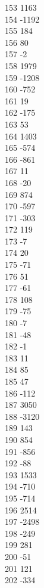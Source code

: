 { 153	1163 \\
 154	-1192 \\
 155	184 \\
 156	80 \\
 157	-2 \\
 158	1979 \\
 159	-1208 \\
 160	-752 \\
 161	19 \\
 162	-175 \\
 163	53 \\
 164	1403 \\
 165	-574 \\
 166	-861 \\
 167	11 \\
 168	-20 \\
 169	874 \\
 170	-597 \\
 171	-303 \\
 172	119 \\
 173	-7 \\
 174	20 \\
 175	-71 \\
 176	51 \\
 177	-61 \\
 178	108 \\
 179	-75 \\
 180	-7 \\
 181	-48 \\
 182	-1 \\
 183	11 \\
 184	85 \\
 185	47 \\
 186	-112 \\
 187	3050 \\
 188	-3120 \\
 189	143 \\
 190	854 \\
 191	-856 \\
 192	-88 \\
 193	1533 \\
 194	-710 \\
 195	-714 \\
 196	2514 \\
 197	-2498 \\
 198	-249 \\
 199	281 \\
 200	-51 \\
 201	121 \\
 202	-334 \\
}
